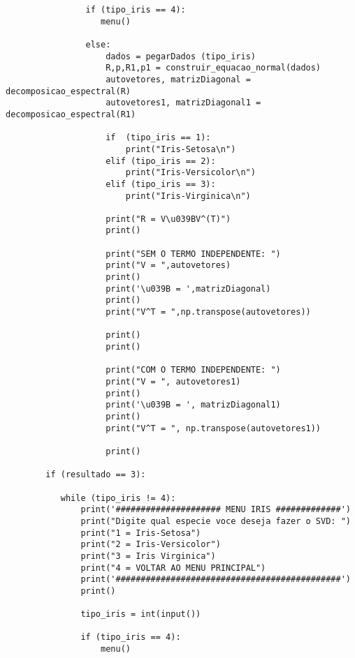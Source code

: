 \documentclass[a4paper,12pt,twoside]{article}
\begin{document}
\begin{lstlisting}
                if (tipo_iris == 4):
                   menu()
                   
                else:
                    dados = pegarDados (tipo_iris)
                    R,p,R1,p1 = construir_equacao_normal(dados)
                    autovetores, matrizDiagonal = decomposicao_espectral(R)
                    autovetores1, matrizDiagonal1 = decomposicao_espectral(R1)
                    
                    if  (tipo_iris == 1):
                        print("Iris-Setosa\n")
                    elif (tipo_iris == 2):
                        print("Iris-Versicolor\n")
                    elif (tipo_iris == 3):
                        print("Iris-Virginica\n")
                    
                    print("R = V\u039BV^(T)")
                    print()
                    
                    print("SEM O TERMO INDEPENDENTE: ")
                    print("V = ",autovetores)
                    print()
                    print('\u039B = ',matrizDiagonal)
                    print()
                    print("V^T = ",np.transpose(autovetores))
                    
                    print()
                    print()
                    
                    print("COM O TERMO INDEPENDENTE: ")
                    print("V = ", autovetores1)
                    print()
                    print('\u039B = ', matrizDiagonal1)
                    print()
                    print("V^T = ", np.transpose(autovetores1))
                    
                    print()
        
        if (resultado == 3):
             
           while (tipo_iris != 4):
               print('##################### MENU IRIS #############')
               print("Digite qual especie voce deseja fazer o SVD: ")
               print("1 = Iris-Setosa")
               print("2 = Iris-Versicolor")
               print("3 = Iris Virginica")
               print("4 = VOLTAR AO MENU PRINCIPAL")
               print('#############################################')
               print()
             
               tipo_iris = int(input())
              
               if (tipo_iris == 4):
                   menu()
               

\end{lstlisting}
\end{document}
